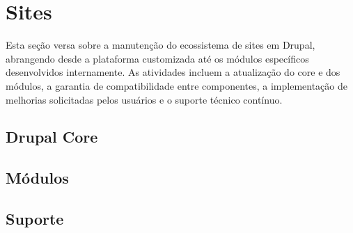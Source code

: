 \chapter{Sites}

Esta seção versa sobre a manutenção do ecossistema de sites em Drupal, abrangendo desde a plataforma customizada até os módulos específicos desenvolvidos internamente. As atividades incluem a atualização do core e dos módulos, a garantia de compatibilidade entre componentes, a implementação de melhorias solicitadas pelos usuários e o suporte técnico contínuo.

\section{Drupal Core}

\newpage
\section{Módulos}

\section{Suporte}
